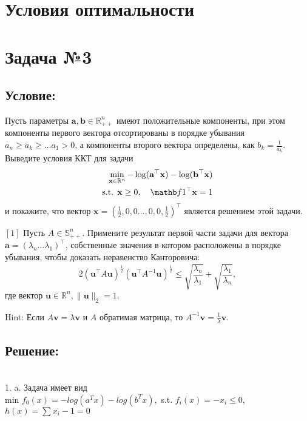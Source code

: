 \documentclass[a4paper,12pt]{article}
\begin{document}
\newpage
\section*{Условия оптимальности}
\section*{Задача №3}
\subsection*{Условие:}
Пусть параметры $\mathbf{a},\mathbf{b}\in\mathbb{R}^n_{++}$ имеют положительные компоненты,  при этом компоненты первого вектора отсортированы в порядке убывания $a_n\geq a_k \geq \dots a_1 > 0$, а компоненты второго вектора определены, как $b_k=\frac{1}{a_k}$. Выведите условия ККТ для задачи
        \begin{equation*}
        \begin{aligned}
      \min_{\mathbf{x}\in\mathbb{R}^n} -\log(\mathbf{a}^\top \mathbf{x})-\log(\mathbf{b}^\top \mathbf{x})\\
              \text{s.t. } \mathbf{x}\geq 0,\quad \mathb
              f{1}^\top \mathbf{x}=1
        \end{aligned}
    \end{equation*}  
    и покажите, что вектор $\mathbf{x}=\left(\frac{1}{2}, 0, 0\dots, 0, 0, \frac{1}{2}\right)^\top$ является решением этой задачи.
        \item $[1]$ Пусть $A\in\mathbb{S}^n_{++}$. Примените результат первой части задачи для вектора $\mathbf{a}=(\lambda_n\dots \lambda_1)^\top$, собственные значения в котором расположены в порядке убывания, чтобы доказать неравенство Канторовича:
        $$2\left(\mathbf{u}^\top A\mathbf{u}\right)^{\frac{1}{2}}\left(\mathbf{u}^\top A^{-1}\mathbf{u}\right)^{\frac{1}{2}}\leq \sqrt{\frac{\lambda_{n}}{\lambda_1}}+\sqrt{\frac{\lambda_{1}}{\lambda_n}},$$
        где вектор $\mathbf{u}\in\mathbb{R}^n, \|\mathbf{u}\|_2=1$.
        
        Hint: Если $A \mathbf{v}=\lambda \mathbf{v}$ и $A$ обратимая матрица, то $A^{-1}\mathbf{v} = \frac{1}{\lambda} \mathbf{v}$.

\subsection*{Решение:}

\\1. a. Задача  имеет вид \\
min $f_0(x) = -log(a^Tx) - log(b^Tx),$ s.t. $f_i(x) = -x_i \leq 0 $, $h(x) = \sum x_i - 1 = 0 $ \\
\end{document}

